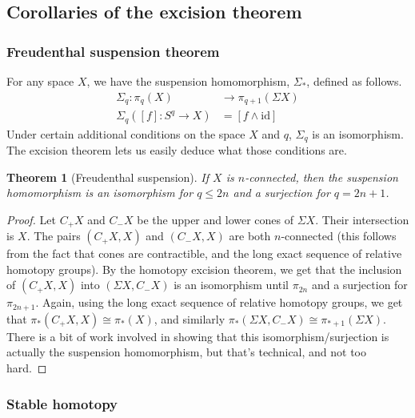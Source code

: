 \documentclass[12pt, notitlepage]{article}
\newtheorem{thm}{Theorem}[section]
\theoremstyle{definition}
\begin{document}
  \subsection{Corollaries of the excision theorem}
  \label{sec:coroll-excis-theor}

  \subsubsection{Freudenthal suspension theorem}
  \label{sec:freud-susp-theor}

  For any space $X$, we have the suspension homomorphism, $\Sigma_{\ast}$, defined as follows.
  \begin{align*}
    \Sigma_{q}: \pi_q(X) &\to \pi_{q+1}(\Sigma X) \\
    \Sigma_{q}([f]: S^q \to X) &= [f \wedge \mathrm{id}]
  \end{align*}
  Under certain additional conditions on the space $X$ and $q$, $\Sigma_q$ is an isomorphism.  The
  excision theorem lets us easily deduce what those conditions are.

\begin{thm}[Freudenthal suspension]
  If $X$ is $n$-connected, then the suspension homomorphism is an isomorphism for $q \leq 2n$ and a
  surjection for $q = 2n+1$.
\end{thm}

\begin{proof}
  Let $C_+X$ and $C_-X$ be the upper and lower cones of $\Sigma X$. Their intersection is $X$.  The
  pairs $(C_+X, X)$ and $(C_-X, X)$ are both $n$-connected (this follows from the fact that cones
  are contractible, and the long exact sequence of relative homotopy groups). By the homotopy
  excision theorem, we get that the inclusion of $(C_+X, X)$ into $(\Sigma X, C_-X)$ is an
  isomorphism until $\pi_{2n}$ and a surjection for $\pi_{2n+1}$. Again, using the long exact
  sequence of relative homotopy groups, we get that $\pi_{\ast}(C_+X, X) \cong \pi_{\ast}(X)$, and
  similarly $\pi_{\ast}(\Sigma X, C_-X) \cong \pi_{\ast+1}(\Sigma X)$. There is a bit of work
  involved in showing that this isomorphism/surjection is actually the suspension homomorphism, but
  that's technical, and not too hard.
\end{proof}

\subsubsection{Stable homotopy}
\label{sec:stable-homotopy}
\end{document}
